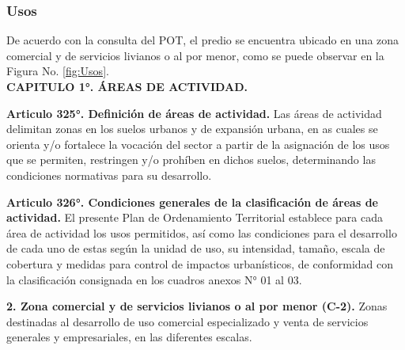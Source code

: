 \documentclass[12pt,a4paper,twoside]{article}
\begin{document}
{\subsubsection{Usos}

De acuerdo con la consulta del POT, el predio se encuentra ubicado en una zona comercial y de servicios livianos o al por menor, como se puede observar en la Figura No. \ref{fig:Usos}.\\

\textbf{CAPITULO 1°. ÁREAS DE ACTIVIDAD.}

\textbf{Articulo 325°. Definición de áreas de actividad.} Las áreas de actividad delimitan zonas en los suelos urbanos y de expansión urbana, en as cuales se orienta y/o fortalece la vocación del sector a partir de la asignación de los usos que se permiten, restringen y/o prohíben en dichos suelos, determinando las condiciones normativas para su desarrollo.

\textbf{Articulo 326°. Condiciones generales de la clasificación de áreas de actividad.} El presente Plan de Ordenamiento Territorial establece para cada área de actividad los usos permitidos, así como las condiciones para el desarrollo de cada uno de estas según la unidad de uso, su intensidad, tamaño, escala de cobertura y medidas para control de impactos urbanísticos, de conformidad con la clasificación consignada en los cuadros anexos N° 01 al 03.

\textbf{2. Zona comercial y de servicios livianos o al por menor (C-2).} Zonas destinadas al desarrollo de uso comercial especializado y venta de servicios generales y empresariales, en las diferentes escalas.

}
\end{document}
